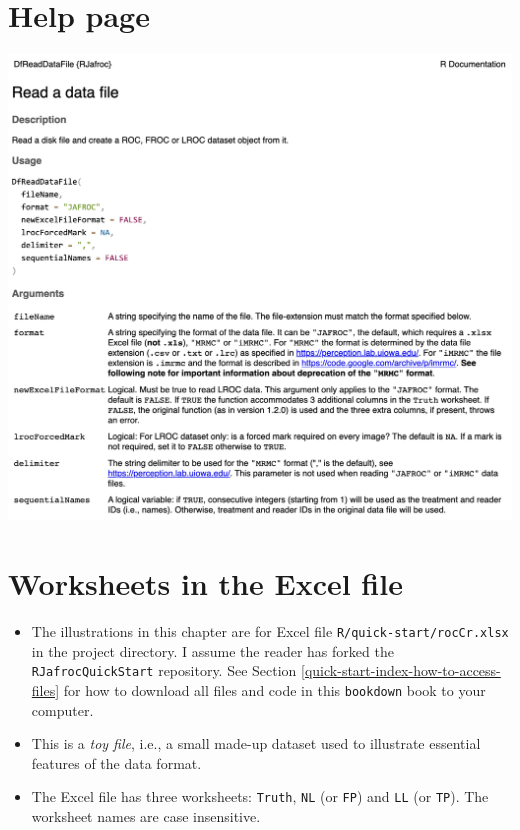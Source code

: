 \documentclass[
]{book}
\begin{document}
\hypertarget{quick-start-roc-note}{%
\section{Help page}\label{quick-start-roc-note}}

\includegraphics[width=22in]{images/roc-data-format/DfReadDataFile}

\hypertarget{quick-start-roc-excel}{%
\section{Worksheets in the Excel file}\label{quick-start-roc-excel}}

\begin{itemize}
\item
  The illustrations in this chapter are for Excel file \texttt{R/quick-start/rocCr.xlsx} in the project directory. I assume the reader has forked the \texttt{RJafrocQuickStart} repository. See Section \ref{quick-start-index-how-to-access-files} for how to download all files and code in this \texttt{bookdown} book to your computer.
\item
  This is a \emph{toy file}, i.e., a small made-up dataset used to illustrate essential features of the data format.
\item
  The Excel file has three worksheets: \texttt{Truth}, \texttt{NL} (or \texttt{FP}) and \texttt{LL} (or \texttt{TP}). The worksheet names are case insensitive.
\end{itemize}
\end{document}
